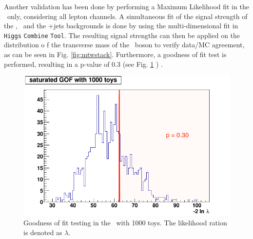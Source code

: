 Another validation has been done by performing a Maximum Likelihood fit in the \WZCR\ only, considering all lepton channels. A simultaneous fit of the signal strength of the \NPE, \NPM\ and the \WZ+jets backgrounds is done by using the multi-dimensional fit in \texttt{Higgs} \texttt{Combine} \texttt{Tool}. The resulting signal strengths can then be applied on the distribution o f the transverse mass of the \PW\ boson to verify data/MC agreement, as can be seen in Fig. \ref{fig:mtwstack}. Furthermore, a goodness of fit test is performed, resulting in a p-value of 0.3 (see Fig. \ref{fig:gof} ) .

\begin{figure}[htbp]
	\centering
	 \includegraphics[width=0.7\linewidth]{6_Search/Figures/GOF/GOF_1000toys}
	\caption{Goodness of fit testing in the \WZCR\  with 1000 toys. The likelihood ration is denoted as $\lambda$.}
	\label{fig:gof}
\end{figure}

